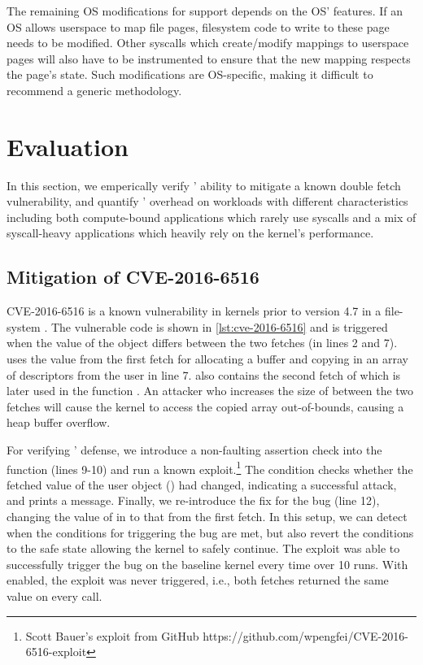 \documentclass[letterpaper,twocolumn,10pt]{article}
\begin{document}
The remaining OS modifications for \midas support depends on 
the OS' features.
If an OS allows userspace to map file pages, filesystem code to write 
to these page needs to be modified.
Other syscalls which create/modify mappings to userspace pages will 
also have to be instrumented to ensure that the new mapping respects the
page's state. 
Such modifications are OS-specific, making it difficult to recommend
a generic methodology.


\section{Evaluation}

In this section, we emperically verify \midas' ability to mitigate 
a known double fetch vulnerability, and quantify \midas' overhead on 
workloads with different characteristics including both compute-bound 
applications which rarely use syscalls and a mix of syscall-heavy applications 
which heavily rely on the kernel's performance.

\subsection{Mitigation of CVE-2016-6516}

CVE-2016-6516 is a known vulnerability in kernels prior to version
4.7 in a file-system . 
The vulnerable code is shown in \autoref{lst:cve-2016-6516} and is 
triggered when the value of the  object differs between 
the two fetches (in lines 2 and 7).
 uses the value from the first fetch for allocating a buffer
and copying in an array of descriptors from the user in line 7.
 also contains the second fetch of 
which is later used in the function .
An attacker who increases the size of  between the 
two fetches will cause the kernel to access the copied array out-of-bounds,
causing a heap buffer overflow.

For verifying \midas' defense, we introduce a non-faulting assertion check into the 
function (lines 9-10) and run a known exploit.\footnote{Scott Bauer's exploit 
from GitHub https://github.com/wpengfei/CVE-2016-6516-exploit}
The condition checks whether the fetched value of the user object ()
had changed, indicating a successful attack, and prints a message.
Finally, we re-introduce the fix for the bug (line 12), changing the value of 
 in  to that from the first fetch.
In this setup, we can detect when the conditions for triggering the bug are met, 
but also revert the conditions to the safe state allowing the kernel to safely
continue.
The exploit was able to successfully trigger the bug on the baseline kernel
every time over 10 runs.
With \midas enabled, the exploit was never triggered, i.e., both fetches 
returned the same value on every call.\\
\end{document}
